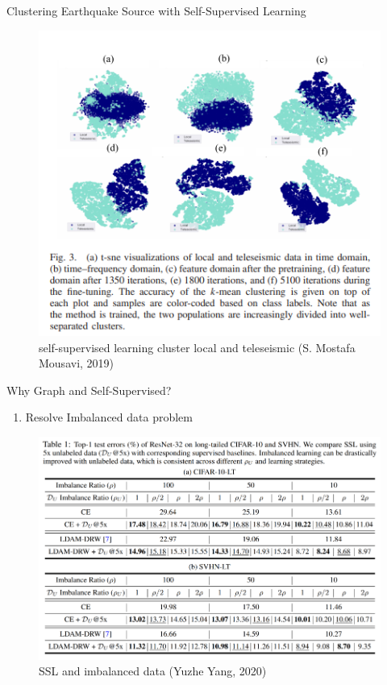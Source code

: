 \documentclass{beamer}
\newcounter{saveenumi}
\newcommand{\seti}{\setcounter{saveenumi}{\value{enumi}}}
\begin{document}
	\begin{frame}[t]{Clustering Earthquake Source with Self-Supervised Learning}
		\begin{figure}
			\includegraphics[scale=0.5]{self.png}
			\caption{self-supervised learning cluster local and teleseismic (S. Mostafa Mousavi, 2019)}
		\end{figure}
	\end{frame}

	\begin{frame}[t]{Why Graph and Self-Supervised?}
	\begin{enumerate}
		\item Resolve Imbalanced data problem
		\seti
	\end{enumerate}
	\begin{figure}
		\includegraphics[scale=0.3]{result.png}
		\caption{SSL and imbalanced data (Yuzhe Yang, 2020)}
	\end{figure}
	\end{frame}
\end{document}
